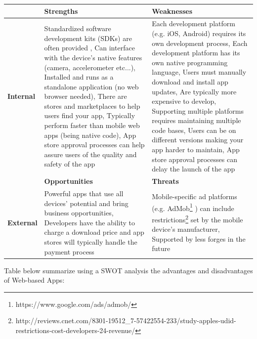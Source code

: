 \documentclass[a4paper,12pt]{book}
\begin{document}
\begin{center}
    \begin{tabular}{ | p{1.7cm} | p{6cm} | p{6cm} |}
    \hline
    & \textbf{Strengths} & \textbf{Weaknesses} \\ \hline
    \textbf{Internal} & 
    Standardized software development kits (SDKs) are often provided , %
    Can interface with the device’s native features (camera, accelerometer etc...),
    Installed and runs as a standalone application (no web browser needed),
    There are stores and marketplaces to help users find your app,
    Typically perform faster than mobile web apps (being native code),
    App store approval processes can help assure users of the quality and safety of the app
    & Each development platform (e.g. iOS, Android) requires its own development process, %
    Each development platform has its own native programming language, 
    Users must manually download and install app updates,
    Are typically more expensive to develop,
    Supporting multiple platforms requires maintaining multiple code bases,
    Users can be on different versions making your app harder to maintain,
    App store approval processes can delay the launch of the app\\ \hline
    & \textbf{Opportunities} & \textbf{Threats} \\ \hline
    \textbf{External}  
    & Powerful apps that use all devices' potential and bring business opportunities, %
    Developers have the ability to charge a download price and app stores will typically handle the payment process
    & Mobile-specific ad platforms (e.g. AdMob\footnote{https://www.google.com/ads/admob/} ) can include restrictions\footnote{http://reviews.cnet.com/8301-19512\_7-57422554-233/study-apples-udid-restrictions-cost-developers-24-revenue/}  set by the mobile device’s manufacturer, %
    Supported by less forges in the future\\ \hline
    \end{tabular}
\end{center}

Table below summarize using a SWOT analysis the advantages and disadvantages of Web-based Apps:
\end{document}
